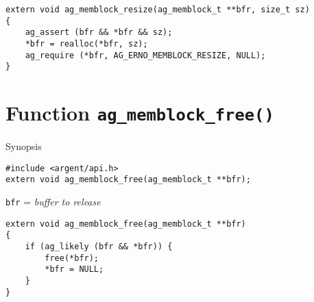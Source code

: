\lstset{style=CODE}
\begin{lstlisting}[linewidth=1.0\linewidth,
    caption=Definition of ag\_memblock\_resize()]
extern void ag_memblock_resize(ag_memblock_t **bfr, size_t sz)
{
    ag_assert (bfr && *bfr && sz);
    *bfr = realloc(*bfr, sz);
    ag_require (*bfr, AG_ERNO_MEMBLOCK_RESIZE, NULL);
}
\end{lstlisting}


%


\section{Function \texttt{ag\_memblock\_free()}}
  \begin{bclogo}[logo=\bccrayon, noborder=true, barre=snake, couleurBarre=gray]
    {Synopsis}
  \lstset{style=SYNOPSIS}
  \begin{lstlisting}[linewidth=1.0\linewidth]
#include <argent/api.h>
extern void ag_memblock_free(ag_memblock_t **bfr);
  \end{lstlisting}
  \scriptsize
  \texttt{bfr} = \emph{buffer to release} \\
  \end{bclogo}

\lstset{style=CODE}
\begin{lstlisting}[linewidth=1.0\linewidth,
    caption=Definition of ag\_memblock\_free()]
extern void ag_memblock_free(ag_memblock_t **bfr)
{
    if (ag_likely (bfr && *bfr)) {
        free(*bfr);
        *bfr = NULL;
    }
}

\end{lstlisting}

